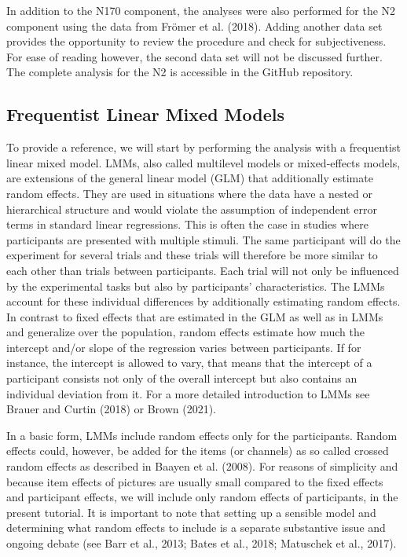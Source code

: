\documentclass[
  doc,12pt,floatsintext]{apa7}
\begin{document}
In addition to the N170 component, the analyses were also performed for the N2 component using the data from Frömer et al. (2018). Adding another data set provides the opportunity to review the procedure and check for subjectiveness. For ease of reading however, the second data set will not be discussed further. The complete analysis for the N2 is accessible in the GitHub repository.

\subsection{Frequentist Linear Mixed Models}\label{frequentist-linear-mixed-models}

To provide a reference, we will start by performing the analysis with a frequentist linear mixed model. LMMs, also called multilevel models or mixed-effects models, are extensions of the general linear model (GLM) that additionally estimate random effects. They are used in situations where the data have a nested or hierarchical structure and would violate the assumption of independent error terms in standard linear regressions. This is often the case in studies where participants are presented with multiple stimuli. The same participant will do the experiment for several trials and these trials will therefore be more similar to each other than trials between participants. Each trial will not only be influenced by the experimental tasks but also by participants' characteristics. The LMMs account for these individual differences by additionally estimating random effects. In contrast to fixed effects that are estimated in the GLM as well as in LMMs and generalize over the population, random effects estimate how much the intercept and/or slope of the regression varies between participants. If for instance, the intercept is allowed to vary, that means that the intercept of a participant consists not only of the overall intercept but also contains an individual deviation from it. For a more detailed introduction to LMMs see Brauer and Curtin (2018) or Brown (2021).

In a basic form, LMMs include random effects only for the participants. Random effects could, however, be added for the items (or channels) as so called crossed random effects as described in Baayen et al. (2008). For reasons of simplicity and because item effects of pictures are usually small compared to the fixed effects and participant effects, we will include only random effects of participants, in the present tutorial. It is important to note that setting up a sensible model and determining what random effects to include is a separate substantive issue and ongoing debate (see Barr et al., 2013; Bates et al., 2018; Matuschek et al., 2017).
\end{document}
